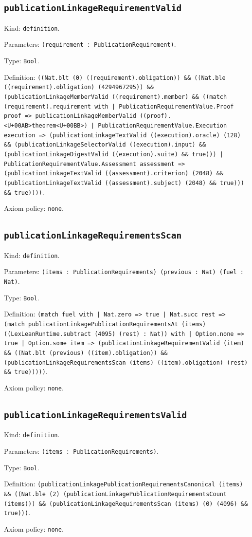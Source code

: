 \documentclass[11pt]{article}
\begin{document}
\subsection*{\texttt{publicationLinkageRequirementValid}}
\noindent Kind: \texttt{definition}.\par
\noindent Parameters: \texttt{(requirement : PublicationRequirement)}.\par
\noindent Type: \texttt{Bool}.\par
\noindent Definition: \texttt{((Nat.blt (0) ((requirement).obligation)) \&\& ((Nat.ble ((requirement).obligation) (4294967295)) \&\& (publicationLinkageMemberValid ((requirement).member) \&\& ((match (requirement).requirement with | PublicationRequirementValue.Proof proof => publicationLinkageMemberValid ((proof).<U+00AB>theorem<U+00BB>) | PublicationRequirementValue.Execution execution => (publicationLinkageTextValid ((execution).oracle) (128) \&\& (publicationLinkageSelectorValid ((execution).input) \&\& (publicationLinkageDigestValid ((execution).suite) \&\& true))) | PublicationRequirementValue.Assessment assessment => (publicationLinkageTextValid ((assessment).criterion) (2048) \&\& (publicationLinkageTextValid ((assessment).subject) (2048) \&\& true))) \&\& true))))}.\par
\noindent Axiom policy: \texttt{none}.\par
\subsection*{\texttt{publicationLinkageRequirementsScan}}
\noindent Kind: \texttt{definition}.\par
\noindent Parameters: \texttt{(items : PublicationRequirements) (previous : Nat) (fuel : Nat)}.\par
\noindent Type: \texttt{Bool}.\par
\noindent Definition: \texttt{(match fuel with | Nat.zero => true | Nat.succ rest => (match publicationLinkagePublicationRequirementsAt (items) ((LexLeanRuntime.subtract (4095) (rest) : Nat)) with | Option.none => true | Option.some item => (publicationLinkageRequirementValid (item) \&\& ((Nat.blt (previous) ((item).obligation)) \&\& (publicationLinkageRequirementsScan (items) ((item).obligation) (rest) \&\& true)))))}.\par
\noindent Axiom policy: \texttt{none}.\par
\subsection*{\texttt{publicationLinkageRequirementsValid}}
\noindent Kind: \texttt{definition}.\par
\noindent Parameters: \texttt{(items : PublicationRequirements)}.\par
\noindent Type: \texttt{Bool}.\par
\noindent Definition: \texttt{(publicationLinkagePublicationRequirementsCanonical (items) \&\& ((Nat.ble (2) (publicationLinkagePublicationRequirementsCount (items))) \&\& (publicationLinkageRequirementsScan (items) (0) (4096) \&\& true)))}.\par
\noindent Axiom policy: \texttt{none}.\par
\end{document}
